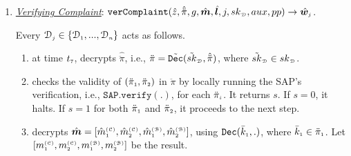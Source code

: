 \begin{enumerate}[leftmargin=.46cm]


\item\label{VerifyingComplaint}  \underline{\textit{Verifying Complaint}}: $\mathtt{verComplaint}(\hat z, \hat{\ddot{\pi}}, g, \hat {\bm m}, \hat{\bm{l}},  j, \\{sk}_{\scriptscriptstyle\mathcal {D}}, aux, pp)\rightarrow \hat{\bm w}_{\scriptscriptstyle j}$.

Every $\mathcal{D}_{\scriptscriptstyle j}\in\{\mathcal{D}_{\scriptscriptstyle 1}, ..., \mathcal{D}_{\scriptscriptstyle n}\}$ acts as follows.
\begin{enumerate}

%
\item at time $t_{\scriptscriptstyle 7}$, decrypts $\hat{\ddot{\pi}}$, i.e., ${\ddot{\pi}}={\tilde{\mathtt {Dec}}}(\tilde{sk}_{\scriptscriptstyle\mathcal {D}}, \hat{\ddot \pi})$, where $\tilde{sk}_{\scriptscriptstyle\mathcal {D}}\in {sk}_{\scriptscriptstyle\mathcal {D}}$. 

\item checks the validity  of $(\ddot{\pi}_{\scriptscriptstyle 1}, \ddot{\pi}_{\scriptscriptstyle 2})$ in $\ddot{\pi}$ by locally running  the SAP's verification, i.e., $\mathtt{SAP.verify}(.)$, for each  $\ddot{\pi}_{\scriptscriptstyle i}$. It   returns  $s$. If $s=0$, it halts. If $s=1$ for both $\ddot{\pi}_{\scriptscriptstyle 1}$ and  $\ddot{\pi}_{\scriptscriptstyle 2}$, it proceeds to the next step. 
%


\item decrypts $\hat{\bm m}=[\hat{m}_{\scriptscriptstyle 1}^{\scriptscriptstyle(\mathcal C)}, \hat{m}_{\scriptscriptstyle 2}^{\scriptscriptstyle(\mathcal C)}, \hat{m}_{\scriptscriptstyle 1}^{\scriptscriptstyle(\mathcal B)}, \hat{m}_{\scriptscriptstyle 2}^{\scriptscriptstyle(\mathcal B)}]$,  using $\mathtt{Dec}(\bar k_{\scriptscriptstyle 1},.)$, where $\bar k_{\scriptscriptstyle 1}\in\ddot \pi_{\scriptscriptstyle 1}$. Let $[{m}_{\scriptscriptstyle 1}^{\scriptscriptstyle(\mathcal C)},  {m}_{\scriptscriptstyle 2}^{\scriptscriptstyle(\mathcal C)},  {m}_{\scriptscriptstyle 1}^{\scriptscriptstyle(\mathcal B)}, {m}_{\scriptscriptstyle 2}^{\scriptscriptstyle(\mathcal B)}]$ be the result. 




\end{enumerate}
\end{enumerate}
